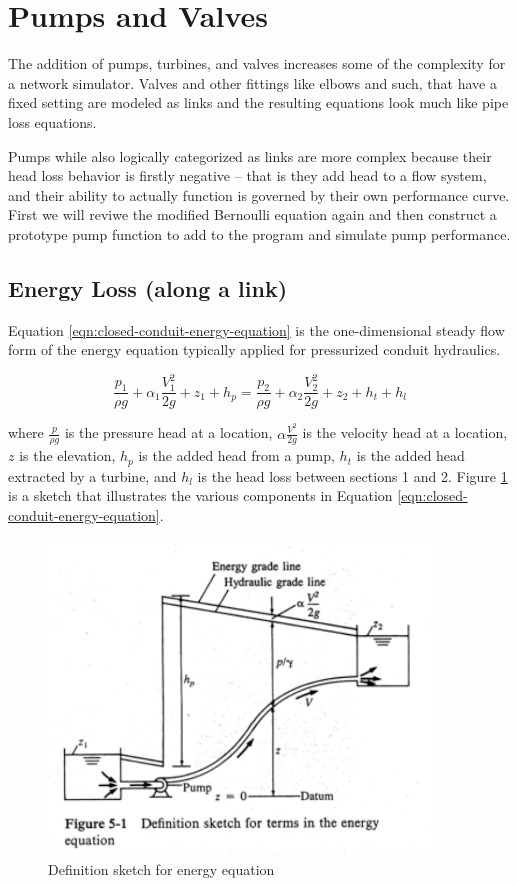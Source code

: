 \section{Pumps and Valves}
The addition of pumps, turbines, and valves increases some of the complexity for a network simulator.
Valves and other fittings like elbows and such, that have a fixed setting are modeled as links and the resulting equations look much like pipe loss equations.

Pumps while also logically categorized as links are more complex because their head loss behavior is firstly negative -- that is they add head to a flow system, and their ability to actually function is governed by their own performance curve.   First we will reviwe the modified Bernoulli equation again and then construct a prototype pump function to add to the program and simulate pump performance.

\subsection{Energy Loss (along a link)}
Equation \ref{eqn:closed-conduit-energy-equation} is the one-dimensional steady flow form of the energy equation typically applied for pressurized conduit hydraulics.
 
\begin{equation}
\frac{p_1}{\rho g}+\alpha_1 \frac{V_1^2}{2g} + z_1 + h_p =
\frac{p_2}{\rho g}+\alpha_2 \frac{V_2^2}{2g} + z_2 + h_t + h_l
\label{eqn:closed-conduit-energy-equation}
\end{equation}

where $\frac{p}{\rho g}$ is the pressure head at a location, $\alpha \frac{V^2}{2g}$ is the velocity head at a location, $z$ is the elevation, $h_p$ is the added head from a pump, $h_t$ is the added head extracted by a turbine, and $h_l$ is the head loss between sections 1 and 2.   Figure \ref{fig:closed-conduit-energy} is a sketch that illustrates the various components in Equation \ref{eqn:closed-conduit-energy-equation}.

\begin{figure}[h!] %
   \centering
   \includegraphics[width=4in]{./10-PumpsAndValves/closed-conduit-energy.pdf} 
   \caption{Definition sketch for energy equation}
   \label{fig:closed-conduit-energy}
\end{figure}

